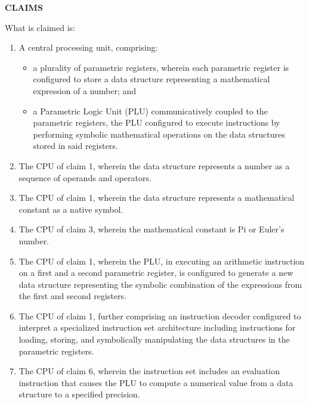 \documentclass[11pt,letterpaper]{article}
\begin{document}
\thispagestyle{empty}

\begin{center}
    \textbf{\large CLAIMS}
\end{center}

\vspace{0.4cm}
\noindent What is claimed is:

\begin{enumerate}[label=\textbf{\arabic*.}, leftmargin=0.5in, itemsep=0.4cm]
    \item A central processing unit, comprising:
    \begin{itemize}[leftmargin=0.3in, noitemsep]
        \item a plurality of parametric registers, wherein each parametric register is configured to store a data structure representing a mathematical expression of a number; and
        \item a Parametric Logic Unit (PLU) communicatively coupled to the parametric registers, the PLU configured to execute instructions by performing symbolic mathematical operations on the data structures stored in said registers.
    \end{itemize}

    \item The CPU of claim 1, wherein the data structure represents a number as a sequence of operands and operators.

    \item The CPU of claim 1, wherein the data structure represents a mathematical constant as a native symbol.

    \item The CPU of claim 3, wherein the mathematical constant is Pi or Euler's number.

    \item The CPU of claim 1, wherein the PLU, in executing an arithmetic instruction on a first and a second parametric register, is configured to generate a new data structure representing the symbolic combination of the expressions from the first and second registers.

    \item The CPU of claim 1, further comprising an instruction decoder configured to interpret a specialized instruction set architecture including instructions for loading, storing, and symbolically manipulating the data structures in the parametric registers.

    \item The CPU of claim 6, wherein the instruction set includes an evaluation instruction that causes the PLU to compute a numerical value from a data structure to a specified precision.


\end{enumerate}
\end{document}
